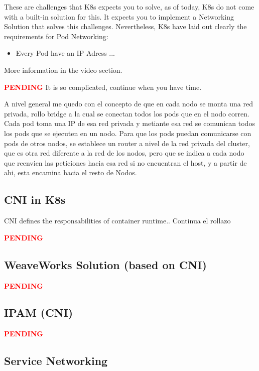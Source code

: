 \documentclass{article}
\begin{document}
These are challenges that K8s expects you to solve, as of today, K8s do not come with a built-in solution for this. It expects you to implement a Networking Solution that solves this challenges. Nevertheless, K8s have laid out clearly the requirements for Pod Networking:

\begin{itemize}
    \item Every Pod have an IP Adress
    ...
\end{itemize}

More information in the video section.

\textcolor{red}{\textbf{PENDING}} It is so complicated, continue when you have time.

A nivel general me quedo con el concepto de que en cada nodo se monta una red privada, rollo bridge a la cual se conectan todos los pods que en el nodo corren. Cada pod toma una IP de esa red privada y metiante esa red se comunican todos los pods que se ejecuten en un nodo. Para que los pods puedan comunicarse con pods de otros nodos, se establece un router a nivel de la red privada del cluster, que es otra red diferente a la red de los nodos, pero que se indica a cada nodo que reenvien las peticiones hacia esa red si no encuentran el host, y a partir de ahi, esta encamina hacia el resto de Nodos.

\subsection{CNI in K8s}

CNI defines the responsabilities of container runtime.. Continua el rollazo

\textcolor{red}{\textbf{PENDING}}

\subsection{WeaveWorks Solution (based on CNI)}

\textcolor{red}{\textbf{PENDING}}

\subsection{IPAM (CNI)}

\textcolor{red}{\textbf{PENDING}}

\subsection{Service Networking}
\end{document}
